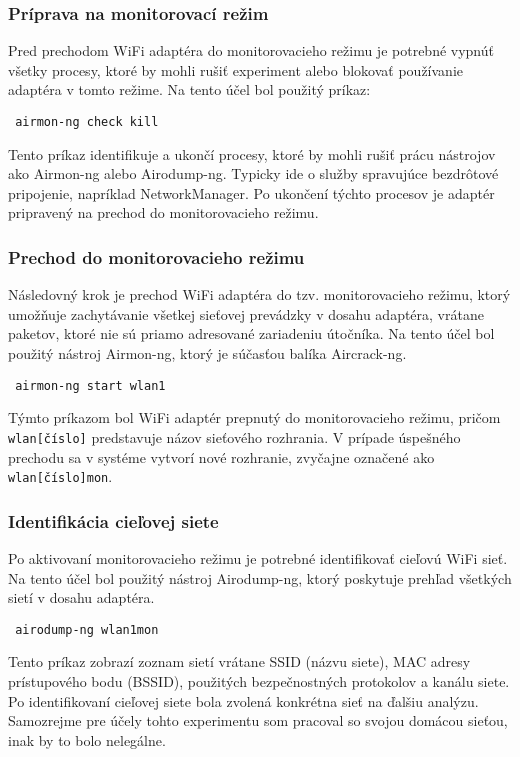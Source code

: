 \documentclass[12pt, twoside]{book}
\begin{document}
\subsubsection{Príprava na monitorovací režim} Pred prechodom WiFi adaptéra do monitorovacieho režimu je potrebné vypnúť všetky procesy, ktoré by mohli rušiť experiment alebo blokovať používanie adaptéra v tomto režime. Na tento účel bol použitý príkaz:

\begin{verbatim} airmon-ng check kill \end{verbatim}

Tento príkaz identifikuje a ukončí procesy, ktoré by mohli rušiť prácu nástrojov ako Airmon-ng alebo Airodump-ng. Typicky ide o služby spravujúce bezdrôtové pripojenie, napríklad NetworkManager. Po ukončení týchto procesov je adaptér pripravený na prechod do monitorovacieho režimu.

\subsubsection{Prechod do monitorovacieho režimu} 
Následovný krok je prechod WiFi adaptéra do tzv. monitorovacieho režimu, ktorý umožňuje zachytávanie všetkej sieťovej prevádzky v dosahu adaptéra, vrátane paketov, ktoré nie sú priamo adresované zariadeniu útočníka. Na tento účel bol použitý nástroj Airmon-ng, ktorý je súčasťou balíka Aircrack-ng.

\begin{verbatim} airmon-ng start wlan1 \end{verbatim}

Týmto príkazom bol WiFi adaptér prepnutý do monitorovacieho režimu, pričom \texttt{wlan[číslo]} predstavuje názov sieťového rozhrania. V prípade úspešného prechodu sa v systéme vytvorí nové rozhranie, zvyčajne označené ako \texttt{wlan[číslo]mon}.

\subsubsection{Identifikácia cieľovej siete} 
Po aktivovaní monitorovacieho režimu je potrebné identifikovať cieľovú WiFi sieť. Na tento účel bol použitý nástroj Airodump-ng, ktorý poskytuje prehľad všetkých sietí v dosahu adaptéra.

\begin{verbatim} airodump-ng wlan1mon \end{verbatim}

Tento príkaz zobrazí zoznam sietí vrátane SSID (názvu siete), MAC adresy prístupového bodu (BSSID), použitých bezpečnostných protokolov a kanálu siete. Po identifikovaní cieľovej siete bola zvolená konkrétna sieť na ďalšiu analýzu. Samozrejme pre účely tohto experimentu som pracoval so svojou domácou sieťou, inak by to bolo nelegálne.
\end{document}
